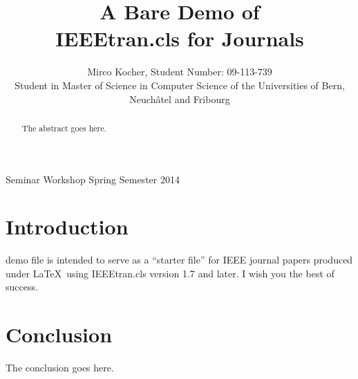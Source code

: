 \documentclass[journal]{IEEEtran}
\begin{document}
\title{A Bare Demo of\\IEEEtran.cls for Journals}

\author{Mirco Kocher, Student Number: 09-113-739\\Student in Master of Science in
Computer Science of the Universities of Bern, Neuchâtel and Fribourg}

%
{Seminar Workshop Spring Semester 2014}

\maketitle


\begin{abstract}
The abstract goes here.
\end{abstract}


\section{Introduction}
 demo file is intended to serve as a ``starter file''
for IEEE journal papers produced under \LaTeX\ using
IEEEtran.cls version 1.7 and later. I wish you the best of success.


\section{Conclusion}
The conclusion goes here.


\end{document}
